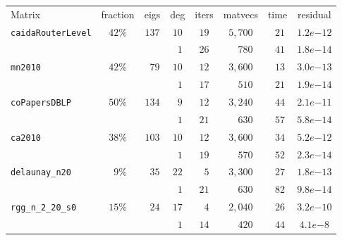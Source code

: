 \begin{tabular}{l|c|c|c|c|c|c|c}
\hline
\multirow{2}{*}{Matrix} & \multirow{2}{*}{fraction} & \multirow{2}{*}{eigs} & \multirow{2}{*}{deg} & \multirow{2}{*}{iters} & \multirow{2}{*}{matvecs} & \multirow{2}{*}{time} & \multirow{2}{*}{residual} \\
 & & & & & & & \\\hline
\hline
\multirow{2}{*}{\texttt{caidaRouterLevel}} & \multirow{2}{*}{$42$\%} & \multirow{2}{*}{$137$} & $10$ & $19$ & $5,700$ & $\phantom{0}21$ & $1.2e{-12}$ \\
 & & & $\phantom{0}1$ & $26$ & $\phantom{0,{}}780$ & $\phantom{0}41$ & $1.8e{-14}$ \\\hline
\multirow{2}{*}{\texttt{mn2010}} & \multirow{2}{*}{$42$\%} & \multirow{2}{*}{$\phantom{0}79$} & $10$ & $12$ & $3,600$ & $\phantom{0}13$ & $3.0e{-13}$ \\
 & & & $\phantom{0}1$ & $17$ & $\phantom{0,{}}510$ & $\phantom{0}21$ & $1.9e{-14}$ \\\hline
\multirow{2}{*}{\texttt{coPapersDBLP}} & \multirow{2}{*}{$50$\%} & \multirow{2}{*}{$134$} & $\phantom{0}9$ & $12$ & $3,240$ & $\phantom{0}44$ & $2.1e{-11}$ \\
 & & & $\phantom{0}1$ & $21$ & $\phantom{0,{}}630$ & $\phantom{0}57$ & $5.8e{-14}$ \\\hline
\multirow{2}{*}{\texttt{ca2010}} & \multirow{2}{*}{$38$\%} & \multirow{2}{*}{$103$} & $10$ & $12$ & $3,600$ & $\phantom{0}34$ & $5.2e{-12}$ \\
 & & & $\phantom{0}1$ & $19$ & $\phantom{0,{}}570$ & $\phantom{0}52$ & $2.3e{-14}$ \\\hline
\multirow{2}{*}{\texttt{delaunay\_n20}} & \multirow{2}{*}{$\phantom{0}9$\%} & \multirow{2}{*}{$\phantom{0}35$} & $22$ & $\phantom{0}5$ & $3,300$ & $\phantom{0}27$ & $1.8e{-13}$ \\
 & & & $\phantom{0}1$ & $21$ & $\phantom{0,{}}630$ & $\phantom{0}82$ & $9.8e{-14}$ \\\hline
\multirow{2}{*}{\texttt{rgg\_n\_2\_20\_s0}} & \multirow{2}{*}{$15$\%} & \multirow{2}{*}{$\phantom{0}24$} & $17$ & $\phantom{0}4$ & $2,040$ & $\phantom{0}26$ & $3.2e{-10}$ \\
 & & & $\phantom{0}1$ & $14$ & $\phantom{0,{}}420$ & $\phantom{0}44$ & $4.1e{-8}$ \\\hline
\end{tabular}